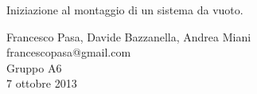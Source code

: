 \begin{center}

	\vspace{0.5cm}
     	{\huge Iniziazione al montaggio di un sistema da vuoto.}
	\vspace{0.5cm}

      	{\large Francesco Pasa, Davide Bazzanella, Andrea Miani} \\
      	{francescopasa@gmail.com} \\
		{\large Gruppo A6} \\
	
	\vspace{0.3cm}
      	{\large 7 ottobre 2013}
    
    \vspace{0.7cm}

\end{center}

